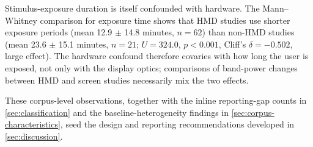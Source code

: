 Stimulus-exposure duration is itself confounded with hardware.
The Mann--Whitney comparison for exposure time shows that HMD studies use shorter exposure periods (mean 12.9 $\pm$ 14.8 minutes, $n = 62$) than non-HMD studies (mean 23.6 $\pm$ 15.1 minutes, $n = 21$; $U = 324.0$, $p < 0.001$, Cliff's $\delta = -0.502$, large effect).
The hardware confound therefore covaries with how long the user is exposed, not only with the display optics; comparisons of band-power changes between HMD and screen studies necessarily mix the two effects.

These corpus-level observations, together with the inline reporting-gap counts in \autoref{sec:classification} and the baseline-heterogeneity findings in \autoref{sec:corpus-characteristics}, seed the design and reporting recommendations developed in \autoref{sec:discussion}.

